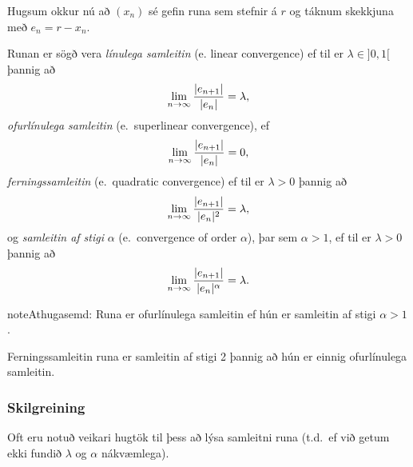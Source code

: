 \documentclass[a4paper,10pt,icelandic]{sphinxmanual}
\begin{document}
Hugsum okkur nú að \((x_n)\) sé gefin runa sem stefnir á \(r\)
og táknum skekkjuna með \(e_n=r-x_n\).

Runan er sögð vera \emph{línulega samleitin} (e. linear convergence) ef til
er \(\lambda\in ]0,1[\) þannig að
\begin{gather}
\begin{split}\lim_{n\to \infty}\dfrac{|e_{n+1}|}{|e_n|}=\lambda,\end{split}\notag
\end{gather}
\emph{ofurlínulega samleitin} (e. superlinear convergence), ef
\begin{gather}
\begin{split}\lim_{n\to \infty}\dfrac{|e_{n+1}|}{|e_n|}=0,\end{split}\notag
\end{gather}
\emph{ferningssamleitin} (e. quadratic convergence) ef til er \(\lambda>0\) þannig að
\begin{gather}
\begin{split}\lim_{n\to \infty}\dfrac{|e_{n+1}|}{|e_n|^2}=\lambda,\end{split}\notag
\end{gather}
og \emph{samleitin af stigi} \(\alpha\) (e. convergence of order
\(\alpha\)), þar sem \(\alpha> 1\), ef til er \(\lambda>0\)
þannig að
\begin{gather}
\begin{split}\lim_{n\to \infty}\dfrac{|e_{n+1}|}{|e_n|^\alpha}=\lambda.\end{split}\notag
\end{gather}
\begin{notice}{note}{Athugasemd:}
Runa er ofurlínulega samleitin ef hún er samleitin af stigi \(\alpha>1\).

Ferningssamleitin runa er samleitin af stigi 2 þannig að hún er einnig ofurlínulega samleitin.
\end{notice}


\subsubsection{Skilgreining}
\label{kafli01:skilgreining}
Oft eru notuð veikari hugtök til þess að lýsa samleitni runa (t.d. ef
við getum ekki fundið \(\lambda\) og \(\alpha\) nákvæmlega).
\end{document}
